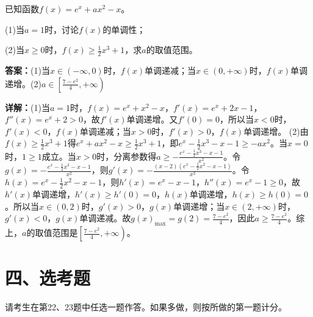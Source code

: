 \begin{question}[points=12]
已知函数$f(x)=e^x+ax^2-x$。

(1)当$a=1$时，讨论$f(x)$的单调性；

(2)当$x\geq 0$时，$f(x)\geq\frac{1}{2}x^3+1$，求$a$的取值范围。
\begin{solution}
\textbf{答案：}(1)当$x\in(-\infty,0)$时，$f(x)$单调递减；当$x\in(0,+\infty)$时，$f(x)$单调递增。(2)$a\in\left[\frac{7-e^2}{4},+\infty\right)$

\textbf{详解：}(1)当$a=1$时，$f(x)=e^x+x^2-x$，$f'(x)=e^x+2x-1$，$f''(x)=e^x+2>0$，故$f'(x)$单调递增。又$f'(0)=0$，所以当$x<0$时，$f'(x)<0$，$f(x)$单调递减；当$x>0$时，$f'(x)>0$，$f(x)$单调递增。
(2)由$f(x)\geq\frac{1}{2}x^3+1$得$e^x+ax^2-x\geq\frac{1}{2}x^3+1$，即$e^x-\frac{1}{2}x^3-x-1\geq -ax^2$。当$x=0$时，$1\geq1$成立。当$x>0$时，分离参数得$a\geq-\frac{e^x-\frac{1}{2}x^3-x-1}{x^2}$。令$g(x)=-\frac{e^x-\frac{1}{2}x^3-x-1}{x^2}$，则$g'(x)=-\frac{(x-2)\left(e^x-\frac{1}{2}x^2-x-1\right)}{x^3}$。令$h(x)=e^x-\frac{1}{2}x^2-x-1$，则$h'(x)=e^x-x-1$，$h''(x)=e^x-1\geq0$，故$h'(x)$单调递增，$h'(x)\geq h'(0)=0$，$h(x)$单调递增，$h(x)\geq h(0)=0$。所以当$x\in(0,2)$时，$g'(x)>0$，$g(x)$单调递增；当$x\in(2,+\infty)$时，$g'(x)<0$，$g(x)$单调递减。故$g(x)_{\max}=g(2)=\frac{7-e^2}{4}$，因此$a\geq\frac{7-e^2}{4}$。综上，$a$的取值范围是$\left[\frac{7-e^2}{4},+\infty\right)$。
\end{solution}
\end{question}

\section*{四、选考题}
请考生在第22、23题中任选一题作答。如果多做，则按所做的第一题计分。

